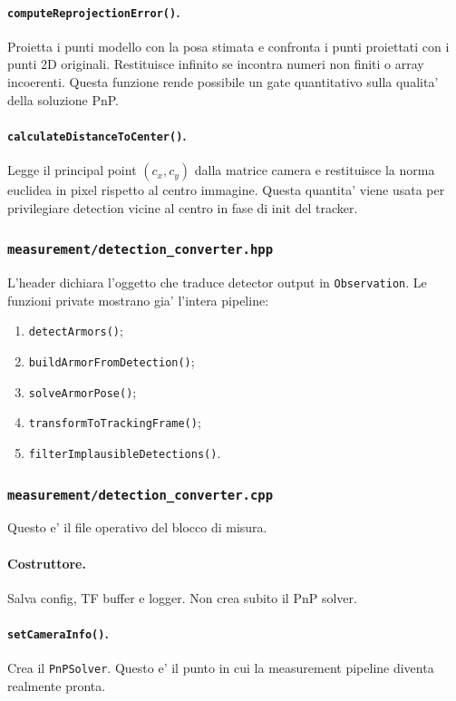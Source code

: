 \documentclass[11pt,a4paper]{article}
\newcommand{\code}[1]{\texttt{#1}}
\begin{document}
\paragraph{\code{computeReprojectionError()}.}
Proietta i punti modello con la posa stimata e confronta i punti proiettati con i punti 2D originali. Restituisce infinito se incontra numeri non finiti o array incoerenti. Questa funzione rende possibile un gate quantitativo sulla qualita' della soluzione PnP.

\paragraph{\code{calculateDistanceToCenter()}.}
Legge il principal point \((c_x, c_y)\) dalla matrice camera e restituisce la norma euclidea in pixel rispetto al centro immagine. Questa quantita' viene usata per privilegiare detection vicine al centro in fase di init del tracker.

\subsubsection{\code{measurement/detection\_converter.hpp}}

L'header dichiara l'oggetto che traduce detector output in \code{Observation}. Le funzioni private mostrano gia' l'intera pipeline:
\begin{enumerate}[leftmargin=1.4em]
  \item \code{detectArmors()};
  \item \code{buildArmorFromDetection()};
  \item \code{solveArmorPose()};
  \item \code{transformToTrackingFrame()};
  \item \code{filterImplausibleDetections()}.
\end{enumerate}

\subsubsection{\code{measurement/detection\_converter.cpp}}

Questo e' il file operativo del blocco di misura.

\paragraph{Costruttore.}
Salva config, TF buffer e logger. Non crea subito il PnP solver.

\paragraph{\code{setCameraInfo()}.}
Crea il \code{PnPSolver}. Questo e' il punto in cui la measurement pipeline diventa realmente pronta.
\end{document}
